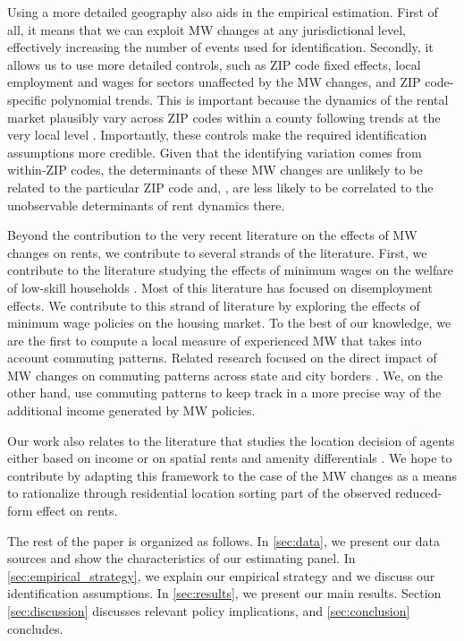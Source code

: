 Using a more detailed geography also aids in the empirical estimation. First of all, it means 
that we can exploit MW changes at any jurisdictional level, effectively increasing the number 
of events used for identification. Secondly, it allows us to use more detailed controls, such as 
ZIP code fixed effects, local employment and wages for sectors unaffected by the MW changes, 
and ZIP code-specific polynomial trends. This is important because the dynamics of the rental 
market plausibly vary across ZIP codes within a county following trends at the very local level 
\parencite{AlmagroDominguez2019}. Importantly, these controls make the required identification 
assumptions more credible. Given that the identifying variation comes from within-ZIP codes, the 
determinants of these MW changes are unlikely to be related to the particular ZIP code and, , are 
less likely to be correlated to the unobservable determinants of rent dynamics there.

Beyond the contribution to the very recent literature on the effects of MW changes on rents, 
we contribute to several strands of the literature. First, we contribute to the literature 
studying the effects of minimum wages on the welfare of low-skill households \parencite[][among 
others]{DinardoEtAl1995, Lee1999, CardKrueger2000, Neumark2006, AutorEtAl2016, CegnizEtAl2019}. 
Most of this literature has focused on disemployment effects. We contribute to this strand of 
literature by exploring the effects of minimum wage policies on the housing market. To the best 
of our knowledge, we are the first to compute a local measure of experienced MW that takes into 
account commuting patterns. Related research focused on the direct impact of MW changes on 
commuting patterns across state and city borders \parencite{Mckinnish2017, PerezPerez2018}. 
We, on the other hand, use commuting patterns to keep track in a more precise way of the 
additional income generated by MW policies.

Our work also relates to the literature that studies the location decision of agents either 
based on income \parencite{Roback1982, Kennan2011, DesmetRossihansberg2013, PerezPerez2018, 
Monras2019} or on spatial rents and amenity differentials \parencite{Diamond2016, 
AlmagroDominguez2019, Couture2019}. We hope to contribute by adapting this framework to the 
case of the MW changes as a means to rationalize through residential location sorting part of 
the observed reduced-form effect on rents.

The rest of the paper is organized as follows. In \autoref{sec:data}, we present our data 
sources and show the characteristics of our estimating panel. In 
\autoref{sec:empirical_strategy}, we explain our empirical strategy and we discuss our 
identification assumptions. In \autoref{sec:results}, we present our main results. Section 
\ref{sec:discussion} discusses relevant policy implications, and 
\autoref{sec:conclusion} concludes.
